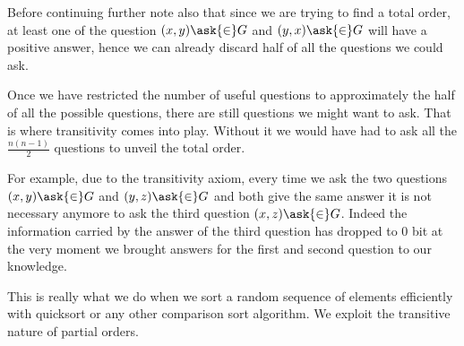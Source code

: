 Before continuing further note also that since we are trying to find a total
order, at least one of the question $(x, y) \ask{\in} G$ and $(y, x)
\ask{\in} G$ will have a positive answer, hence we can already discard
half of all the questions we could ask.

Once we have restricted the number of useful questions to approximately the
half of all the possible questions, there are still  questions we
might want to ask. That is where transitivity comes into play. Without it we
would have had to ask all the $\frac{n (n-1)}{2}$ questions to unveil the total
order.

For example, due to the transitivity axiom, every time we ask the two questions
$(x, y) \ask{\in} G$ and $(y, z) \ask{\in} G$ and both give the
same answer it is not necessary anymore to ask the third question $(x, z)
\ask{\in} G$. Indeed the information carried by the answer of the
third question has dropped to 0 bit at the very moment we brought answers for
the first and second question to our knowledge.

This is really what we do when we sort a random sequence of elements
efficiently with quicksort or any other  comparison sort
algorithm. We exploit the transitive nature of partial orders.
